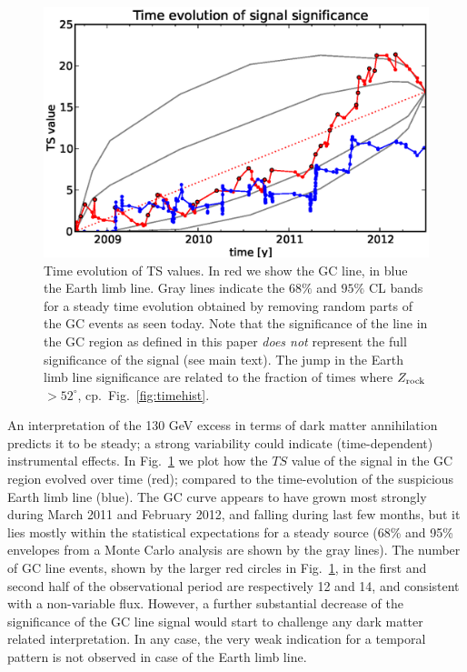\documentclass[aps,twocolumn,prd,superscriptaddress,showpacs,nofootinbib,fixfloat]{revtex4}
\newcommand{\zrock}{$Z_{\rm rock}$}
\begin{document}
\begin{figure}
  \begin{center}
    \includegraphics[width=1.0\linewidth]{plots/TS_time.eps}
  \end{center}
  \caption{Time evolution of TS values. In red we show the
  GC line, in blue the Earth limb line. Gray lines indicate
  the $68\%$ and $95\%$ CL bands for a steady time evolution
  obtained by removing random parts of the GC events as seen
  today. Note that the significance of the line in the GC region as defined in
  this paper \emph{does not} represent the full significance of the signal (see main
  text). The jump in the Earth limb line significance are related to the
  fraction of times where \zrock$>52^\circ$, cp.~Fig.~\ref{fig:timehist}.}
  \label{fig:timeevolution}
\end{figure}

An interpretation of the 130 GeV excess in
terms of dark matter annihilation predicts it to be steady;
a strong variability could
indicate (time-dependent) instrumental effects. In
Fig.~\ref{fig:timeevolution} we plot how the $TS$ value of
the signal in the GC region evolved over time (red);
compared to the time-evolution of the suspicious Earth limb
line (blue). The GC curve appears to have grown most
strongly during March 2011 and February 2012, and falling
during last few months, but it lies mostly within the
statistical expectations for a steady source (68\% and 95\% envelopes from a
Monte Carlo analysis are shown by the gray lines). The number of
GC line events, shown by the larger red circles in
Fig.~\ref{fig:timeevolution}, in the first and second half
of the observational period are respectively 12 and 14, and
consistent with a non-variable flux. However, a further
substantial decrease of the significance of the GC line
signal would start to challenge any dark matter related
interpretation. In any case, the very weak indication for
a temporal pattern is not observed in case of the Earth limb
line. 
\end{document}
